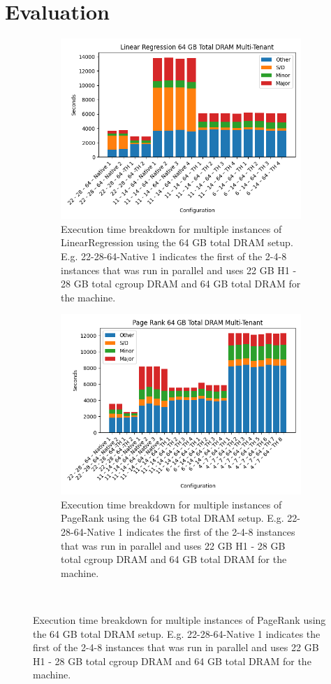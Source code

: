 \section{Evaluation}
\label{sec:eval}

\begin{figure}[htbp]
\centering
\begin{subfigure}[b]{0.48\textwidth}
    \includegraphics[width=\linewidth]{./fig/linr64.png}
    \caption{Execution time breakdown for multiple instances of
    LinearRegression using the 64 GB total DRAM setup. E.g.
    22-28-64-Native 1 indicates the first of the 2-4-8 instances that
    was run in parallel and uses 22 GB H1 - 28 GB total cgroup DRAM
    and 64 GB total DRAM for the machine.}
    \label{fig:linr64}
\end{subfigure}
\begin{subfigure}[b]{0.48\textwidth}
    \includegraphics[width=\linewidth]{./fig/pr64.png}
    \caption{Execution time breakdown for multiple instances of
    PageRank using the 64 GB total DRAM setup. E.g. 22-28-64-Native 1
    indicates the first of the 2-4-8 instances that was run in
    parallel and uses 22 GB H1 - 28 GB total cgroup DRAM and 64 GB
    total DRAM for the machine.}
    \label{fig:pr64}
\end{subfigure}\\[1em]
\end{figure}


